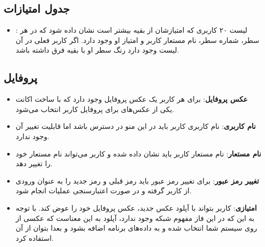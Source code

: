 \documentclass[]{article}
\begin{document}
\subsection*{{\titr جدول امتیازات}}

\begin{itemize}
    \item {}: 
     لیست ۲۰ کاربری که امتیازشان از بقیه بیشتر است نشان داده شود که در هر سطر، شماره سطر،  نام مستعار کاربر و امتیاز او وجود دارد. اگر کاربر فعلی در آن لیست وجود دارد رنگ سطر او با بقیه فرق داشته باشد.
\end{itemize}


\subsection*{{\titr پروفایل}}
\begin{itemize}
    \item \textbf{عکس پروفایل}:
     برای هر کاربر یک عکس پروفایل وجود دارد که با ساخت اکانت یکی از عکس‌های  برای پروفایل کاربر انتخاب می‌شود.
    \item \textbf{نام کاربری}:
     نام کاربری کاربر باید در این منو در دسترس باشد اما قابلیت تغییر آن وجود ندارد.
    \item \textbf{نام مستعار}:
     نام مستعار کاربر باید نشان داده شده و کاربر می‌تواند نام مستعار خود را تغییر دهد.
    \item \textbf{تغییر رمز عبور}:
     برای تغییر رمز عبور باید رمز قبلی و رمز جدید را به عنوان ورودی از کاربر گرفته و در صورت اعتبارسنجی عملیات انجام شود.
     
    \item \textbf{امتیازی}: کاربر بتواند با آپلود عکس جدید، عکس پروفایل‌ خود را عوض کند. با توجه به این که در این فاز مفهوم شبکه وجود ندارد، آپلود به این معناست که عکسی از روی سیستم شما انتخاب شده و به داده‌های برنامه اضافه بشود و بعدا بتوان از آن استفاده کرد.
\end{itemize}
\end{document}
